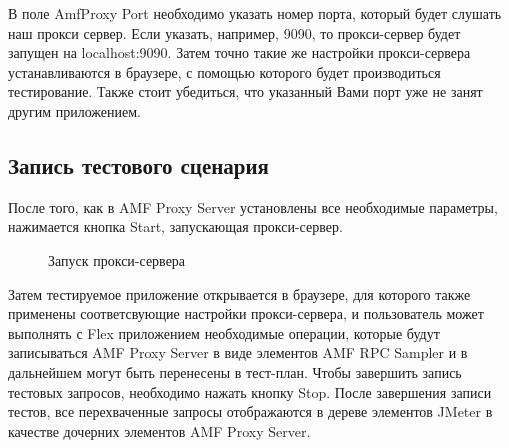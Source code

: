 В поле AmfProxy Port необходимо указать номер порта, который будет слушать наш прокси сервер.
Если указать, например, 9090, то прокси-сервер будет запущен на localhost:9090.
Затем точно такие же настройки прокси-сервера устанавливаются в браузере, с помощью которого будет
производиться тестирование. Также стоит убедиться, что указанный Вами порт уже не занят другим приложением.

\subsection{Запись тестового сценария}

После того, как в AMF Proxy Server установлены все необходимые параметры, нажимается кнопка Start,
запускающая прокси-сервер.

\begin{figure}[h]
\caption{Запуск прокси-сервера}
\label{ris:proxyStart.png}
\end{figure}

Затем тестируемое приложение открывается в браузере, для которого также
применены соответсвующие настройки прокси-сервера, и пользователь может выполнять с Flex приложением
необходимые операции, которые будут записываться AMF Proxy Server в виде элементов AMF RPC Sampler и в
дальнейшем могут быть перенесены в тест-план. Чтобы завершить запись тестовых запросов, необходимо
нажать кнопку Stop. После завершения записи тестов, все перехваченные запросы отображаются в дереве
элементов JMeter в качестве дочерних элементов AMF Proxy Server.


